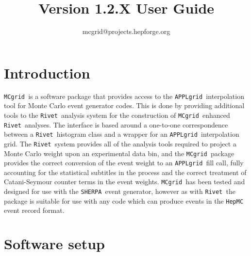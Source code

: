 \documentclass[11pt]{article}
\title{\mcgrid Version 1.2.X User Guide}
\author{mcgrid@projects.hepforge.org}
\newcommand{\mcgrid} {{\tt MCgrid }}
\newcommand{\rivet} {{\tt Rivet }}
\newcommand{\appl} {{\tt APPLgrid }}
\newcommand{\sherpa} {{\tt SHERPA }}
\begin{document}
\date{}
\maketitle
\tableofcontents
\section{Introduction}
\mcgrid is a software package that provides access to the \appl interpolation tool for Monte Carlo event generator codes. This is done by providing additional tools to the \rivet analysis system for the construction of \mcgrid enhanced \rivet analyses. The interface is based around a one-to-one correspondence between a \rivet histogram class and a wrapper for an \appl interpolation grid. The \rivet system provides all of the analysis tools required to project a Monte Carlo weight upon an experimental data bin, and the \mcgrid package provides the correct conversion of the event weight to an \appl fill call, fully accounting for the statistical subtitles in the process and the correct treatment of Catani-Seymour counter terms in the event weights. \mcgrid has been tested and designed for use with the \sherpa event generator, however as with \rivet the package is suitable for use with any code which can produce events in the {\tt HepMC} event record format.
\clearpage

\section{Software setup}
\end{document}
